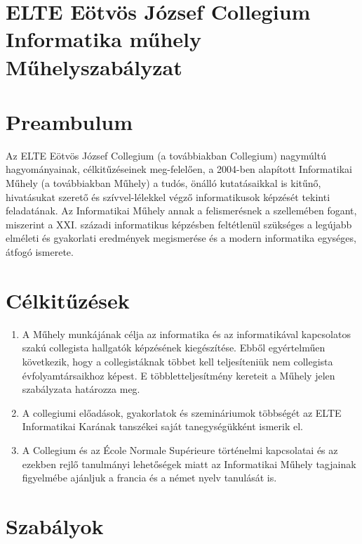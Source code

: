 \documentclass{../styles/rulebook}
\begin{document}
\section*{ELTE Eötvös József Collegium \\ Informatika műhely\\ \vspace{0.5em} Műhelyszabályzat} 

\vspace{2em}

\section*{Preambulum}

Az ELTE Eötvös József Collegium (a továbbiakban Collegium) nagymúltú hagyományainak, célkitűzéseinek meg-felelően, a 2004-ben alapított Informatikai Műhely (a továbbiakban Műhely) a tudós, önálló kutatásaikkal is kitűnő, hivatásukat szerető és szívvel-lélekkel végző informatikusok képzését tekinti feladatának. Az Informatikai Műhely annak a felismerésnek a szellemében fogant, miszerint a XXI. századi informatikus képzésben feltétlenül szükséges a legújabb elméleti és gyakorlati eredmények megismerése és a modern informatika egységes, átfogó ismerete.

\section{Célkitűzések}

\begin{enumerate}
	\item A Műhely munkájának célja az informatika és az informatikával kapcsolatos szakú collegista hallgatók képzésének kiegészítése. Ebből egyértelműen következik, hogy a collegistáknak többet kell teljesíteniük nem collegista évfolyamtársaikhoz képest. E többletteljesítmény kereteit a Műhely jelen szabályzata határozza meg.
	\item A collegiumi előadások, gyakorlatok és szemináriumok többségét az ELTE Informatikai Karának tanszékei saját tanegységükként ismerik el.
	\item A Collegium és az École Normale Supérieure történelmi kapcsolatai és az ezekben rejlő tanulmányi lehetőségek miatt az Informatikai Műhely tagjainak figyelmébe ajánljuk a francia és a német nyelv tanulását is.
\end{enumerate}


\section{Szabályok}
\end{document}

